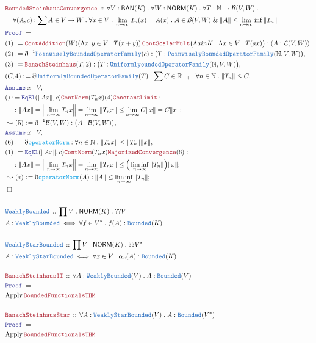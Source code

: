 \documentclass[12pt]{scrartcl}
\newcommand{\TYPE}[1]{\textcolor{NavyBlue}{\mathtt{#1}}}
\newcommand{\FUNC}[1]{\textcolor{Cerulean}{\mathtt{#1}}}
\newcommand{\LOGIC}[1]{\textcolor{Blue}{\mathtt{#1}}}
\newcommand{\THM}[1]{\textcolor{Maroon}{\mathtt{#1}}}
\renewcommand{\.}{\; . \;}
\newcommand{\de}{: \kern 0.1pc =}
\newcommand{\Theorem}[2]{& \THM{#1} \, :: \, #2 \\ & \Proof = \\ }
\newcommand{\DeclareType}[2]{& \TYPE{#1} \, :: \, #2 \\}
\newcommand{\DefineType}[3]{& #1 : \TYPE{#2} \iff #3 \\}
\newcommand{\NewLine}{\\ & \kern 1pc}
\newcommand{\Page}[1]{\begin{align*} #1 \end{align*} \newpage   }
\newcommand{ \bd }{ \ByDef }
\renewcommand{\And}{\; \& \;}
\newcommand{\Reals}{\mathbb{R} }
\newcommand{\Nat}{\mathbb{N} }
\newcommand{\Say}[3]{& #1 \de #2 : #3, \\}
\newcommand{\Conclude}[3]{& #1 \de #2 : #3; \\}
\newcommand{\Derive}[3]{& \leadsto #1 \de #2 : #3, \\}
\newcommand{\DeriveConclude}[3]{& \leadsto #1 \de #2 : #3 ; \\}
\newcommand{\A}{\LOGIC{Assume} \;}
\newcommand{\Assume}[2]{& \A #1 : #2, \\}
\newcommand{\QED}{\; \square}
\newcommand{\EndProof}{& \QED \\}
\newcommand{\ByDef}{\eth}
\newcommand{\Proof}{\LOGIC{Proof} \; }
\newcommand{\NORM}{\textsf{NORM}}
\newcommand{\BAN}{\textsf{BAN}}
\newcommand{\B}{\mathcal{B}}
\begin{document}
\Page{
\Theorem{BoundedSteinhausConvergence}{\forall V : \BAN(K) \. \forall W : \NORM(K) \. \forall T : \Nat \to \B(V,W) \. 
\NewLine
\forall (A,c) : \sum A \in V \to W \. \forall x \in V \.  \lim_{n \to \infty} T_n(x) = A(x) \. A \in \B(V,W) \And \| A \| \le \lim_{n \to \infty} \inf \| T_n \|
}
\Say{(1)}{\THM{ContAddition}(W)(\Lambda x,y \in V \. T(x + y)) \, \THM{ContScalarMult}\big(\Lambda a in K \. 
\Lambda x \in V \. T(ax) \big)}{(A : \mathcal{L}(V,W))}
\Say{(2)}{\bd^{-1} \TYPE{PoinwiselyBoundedOperatorFamily}(c)}{\big( T :  \TYPE{PoinwiselyBoundedOperatorFamily}(\Nat,V,W)  \big)}
\Say{(3)}{\THM{BanachSteinhaus}(T,2)}{\big( T :  \TYPE{UniformlyoundedOperatorFamily}(\Nat,V,W)  \big)}
\Say{(C,4)}{\bd \TYPE{UniformlyBoundedOperatorFamily}(T) }{ \sum C \in \Reals_{++} \. \forall n \in \Nat \. \| T_n \| \le C}
\Assume{x}{V}
\Conclude{()}{\LOGIC{EqEl}(\| Ax \|, c)\THM{ContNorm}(T_n x)(4)\THM{ConstantLimit}}{ 
 \NewLine :
 \| A x \| = \Big\| \lim_{n \to \infty} T_n x  \Big\| =\lim_{n \to \infty} \| T_n x \| \le \lim_{n \to \infty} C\| x \| = C\| x \| }
\Derive{(5)}{\bd^{-1} \B(V,W)}{\big( A : \B(V,W) \big)}
\Assume{x}{V}
\Say{(6)}{\bd \FUNC{operatorNorm} }{ \forall n \in \Nat \. \| T_n x \| \le \| T_n \| \| x \|}
\Conclude{(1)}{ \LOGIC{EqEl}(\| Ax \|, c)\THM{ContNorm}(T_n x) \THM{MajorizedConvergence}(6)}{ 
\NewLine :
 \| A x \| = \Big\| \lim_{n \to \infty} T_n x  \Big\|= \lim_{n \to \infty} \| T_n x \| \le 
\Big( \liminf_{n \to \infty} \| T_n \| \Big) \| x \| }
\DeriveConclude{(*)}{\bd \FUNC{operatorNorm}(A)}{ \| A \| \le \liminf_{n \to \infty} \| T_n \| }
\EndProof
\\
\DeclareType{WeaklyBounded}{\prod V : \NORM(K) \. ?? V}
\DefineType{A}{WeaklyBounded}{ \forall f \in V^* \. f(A) : \TYPE{Bounded}(K)}
\\
\DeclareType{WeaklyStarBounded}{\prod V : \NORM(K) \. ?? V^*}
\DefineType{A}{WeaklyStarBounded}{ \forall x \in V \. \alpha_x(A) : \TYPE{Bounded}(K)}
\\
\Theorem{BanachSteinhausII}{\forall A : \TYPE{WeaklyBounded}(V) \. A : \TYPE{Bounded}(V)}
& \textrm{Apply} \, \THM{BoundedFunctionalsTHM} \\
\\
\Theorem{BanachSteinhausStar}{\forall A : \TYPE{WeaklyStarBounded}(V) \. A : \TYPE{Bounded}(V^*)}
& \textrm{Apply} \, \THM{BoundedFunctionalsTHM} \\
}
\end{document}

